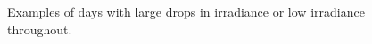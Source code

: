 \begin{figure}[ht!]
    \qquad
    \caption{Examples of days with large drops in irradiance or low irradiance throughout.
    \label{fig:less_high}}
\end{figure}